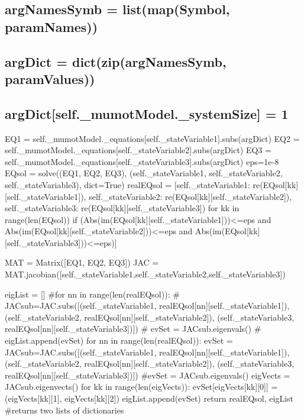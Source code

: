 \subsection*{}

\subsection*{arg\+Names\+Symb = list(map(\+Symbol, param\+Names))}

\subsection*{arg\+Dict = dict(zip(arg\+Names\+Symb, param\+Values))}

\subsection*{arg\+Dict\mbox{[}self.\+\_\+mumot\+Model.\+\_\+system\+Size\mbox{]} = 1}

\begin{DoxyVerb}    EQ1 = self._mumotModel._equations[self._stateVariable1].subs(argDict)
    EQ2 = self._mumotModel._equations[self._stateVariable2].subs(argDict)
    EQ3 = self._mumotModel._equations[self._stateVariable3].subs(argDict)
    eps=1e-8
    EQsol = solve((EQ1, EQ2, EQ3), (self._stateVariable1, self._stateVariable2, self._stateVariable3), dict=True)
    realEQsol = [{self._stateVariable1: re(EQsol[kk][self._stateVariable1]), self._stateVariable2: re(EQsol[kk][self._stateVariable2]), self._stateVariable3: re(EQsol[kk][self._stateVariable3])} for kk in range(len(EQsol)) if (Abs(im(EQsol[kk][self._stateVariable1]))<=eps and Abs(im(EQsol[kk][self._stateVariable2]))<=eps and Abs(im(EQsol[kk][self._stateVariable3]))<=eps)]

    MAT = Matrix([EQ1, EQ2, EQ3])
    JAC = MAT.jacobian([self._stateVariable1,self._stateVariable2,self._stateVariable3])

    eigList = []
    #for nn in range(len(realEQsol)): 
    #    JACsub=JAC.subs([(self._stateVariable1, realEQsol[nn][self._stateVariable1]), (self._stateVariable2, realEQsol[nn][self._stateVariable2]), (self._stateVariable3, realEQsol[nn][self._stateVariable3])])
    #    evSet = JACsub.eigenvals()
    #    eigList.append(evSet)
    for nn in range(len(realEQsol)): 
        evSet = {}
        JACsub=JAC.subs([(self._stateVariable1, realEQsol[nn][self._stateVariable1]), (self._stateVariable2, realEQsol[nn][self._stateVariable2]), (self._stateVariable3, realEQsol[nn][self._stateVariable3])])
        #evSet = JACsub.eigenvals()
        eigVects = JACsub.eigenvects()
        for kk in range(len(eigVects)):
            evSet[eigVects[kk][0]] = (eigVects[kk][1], eigVects[kk][2])
        eigList.append(evSet)
    return realEQsol, eigList #returns two lists of dictionaries \end{DoxyVerb}
 

